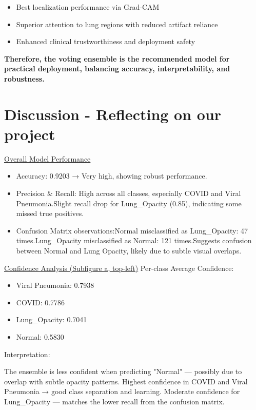\documentclass{article}
\begin{document}
\begin{itemize}
  \item Best localization performance via Grad-CAM
  \item Superior attention to lung regions with reduced artifact reliance
  \item Enhanced clinical trustworthiness and deployment safety
\end{itemize}

\noindent
\textbf{Therefore, the voting ensemble is the recommended model for practical deployment, balancing accuracy, interpretability, and robustness.}






\section{Discussion - Reflecting on our project}

\underline{ Overall Model Performance }
\begin{itemize}
    \item Accuracy: 0.9203 → Very high, showing robust performance.
    \item Precision \& Recall: High across all classes, especially COVID and Viral Pneumonia.Slight recall drop for Lung\_Opacity (0.85), indicating some missed true positives.
    \item Confusion Matrix observations:Normal misclassified as Lung\_Opacity: 47 times.Lung\_Opacity misclassified as Normal: 121 times.Suggests confusion between Normal and Lung Opacity, likely due to subtle visual overlaps.
\end{itemize}

\underline{Confidence Analysis (Subfigure a, top-left)}
Per-class Average Confidence:
\begin{itemize}
    \item Viral Pneumonia: 0.7938
    \item COVID: 0.7786
    \item Lung\_Opacity: 0.7041
    \item Normal: 0.5830
\end{itemize}

Interpretation:

The ensemble is less confident when predicting "Normal" — possibly due to overlap with subtle opacity patterns.
Highest confidence in COVID and Viral Pneumonia → good class separation and learning.
Moderate confidence for Lung\_Opacity — matches the lower recall from the confusion matrix.
\end{document}
